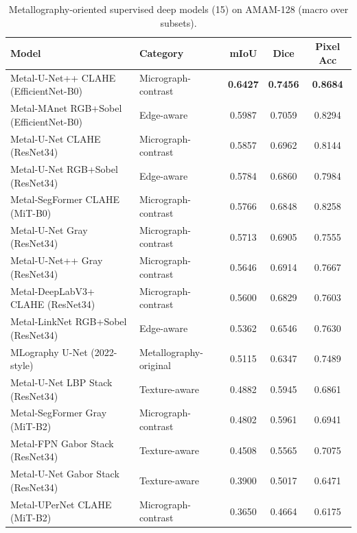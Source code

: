 \documentclass{article}
\newcommand{\datasetname}{AMAM-128}
\newcommand{\tablefontsize}{\small}
\begin{document}
\begin{table}[ht]
    \centering
    \tablefontsize
    \caption{Metallography-oriented supervised deep models (15) on \datasetname{} (macro over subsets).}
    \label{tab:deep-metal}
    \begin{tabular}{llccc}
        \toprule
        Model & Category & mIoU & Dice & Pixel Acc \\
        \midrule
        Metal-U-Net++ CLAHE (EfficientNet-B0) & Micrograph-contrast & \textbf{0.6427} & \textbf{0.7456} & \textbf{0.8684} \\
        Metal-MAnet RGB+Sobel (EfficientNet-B0) & Edge-aware & 0.5987 & 0.7059 & 0.8294 \\
        Metal-U-Net CLAHE (ResNet34) & Micrograph-contrast & 0.5857 & 0.6962 & 0.8144 \\
        Metal-U-Net RGB+Sobel (ResNet34) & Edge-aware & 0.5784 & 0.6860 & 0.7984 \\
        Metal-SegFormer CLAHE (MiT-B0) & Micrograph-contrast & 0.5766 & 0.6848 & 0.8258 \\
        Metal-U-Net Gray (ResNet34) & Micrograph-contrast & 0.5713 & 0.6905 & 0.7555 \\
        Metal-U-Net++ Gray (ResNet34) & Micrograph-contrast & 0.5646 & 0.6914 & 0.7667 \\
        Metal-DeepLabV3+ CLAHE (ResNet34) & Micrograph-contrast & 0.5600 & 0.6829 & 0.7603 \\
        Metal-LinkNet RGB+Sobel (ResNet34) & Edge-aware & 0.5362 & 0.6546 & 0.7630 \\
        MLography U-Net (2022-style) & Metallography-original & 0.5115 & 0.6347 & 0.7489 \\
        Metal-U-Net LBP Stack (ResNet34) & Texture-aware & 0.4882 & 0.5945 & 0.6861 \\
        Metal-SegFormer Gray (MiT-B2) & Micrograph-contrast & 0.4802 & 0.5961 & 0.6941 \\
        Metal-FPN Gabor Stack (ResNet34) & Texture-aware & 0.4508 & 0.5565 & 0.7075 \\
        Metal-U-Net Gabor Stack (ResNet34) & Texture-aware & 0.3900 & 0.5017 & 0.6471 \\
        Metal-UPerNet CLAHE (MiT-B2) & Micrograph-contrast & 0.3650 & 0.4664 & 0.6175 \\
        \bottomrule
    \end{tabular}
\end{table}
\end{document}
